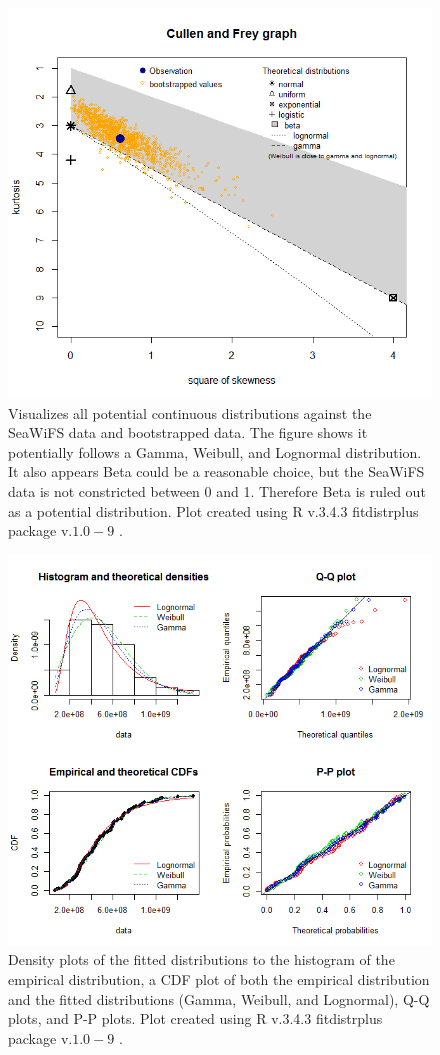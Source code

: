 \documentclass[oneside,12pt,final]{sty/ucthesis-CA2012}
\let\cite\citep                             %
\begin{document}
\begin{mainmatter}
\begin{figure}[H]
     \centering
       \includegraphics[width=.7\textwidth]{fig/Scen2gof}
    \caption{Visualizes all potential continuous distributions against the SeaWiFS data and bootstrapped data. The figure shows it potentially follows a Gamma, Weibull, and Lognormal distribution. It also appears Beta could be a reasonable choice, but the SeaWiFS data is not constricted between 0 and 1. Therefore Beta is ruled out as a potential distribution. Plot created using R v.3.4.3 \cite{Rcite} fitdistrplus package v.$1.0-9$ \cite{fitdistrplus}. }
    \label{SeaWiFSgof}
\end{figure}

\begin{figure}[H]
     \centering
       \includegraphics[width=.7\textwidth]{fig/Scen2gof2}
    \caption{Density plots of the fitted distributions to the histogram of the empirical distribution, a CDF plot of both the empirical distribution and the fitted distributions (Gamma, Weibull, and Lognormal), Q-Q plots, and P-P plots. Plot created using R v.3.4.3 \cite{Rcite} fitdistrplus package v.$1.0-9$ \cite{fitdistrplus}. }
    \label{SeaWiFSgof2}
\end{figure}


\end{mainmatter}
\end{document}
